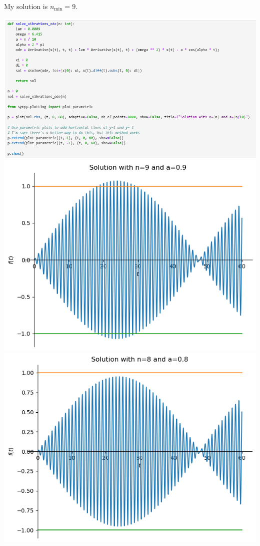 \documentclass[a4paper]{article}
\begin{document}
My solution is $n_\text{min} = 9$.

\includegraphics[width=\linewidth]{Q3-b}
\includegraphics[width=\linewidth]{n9}
\includegraphics[width=\linewidth]{n8}
\end{document}

